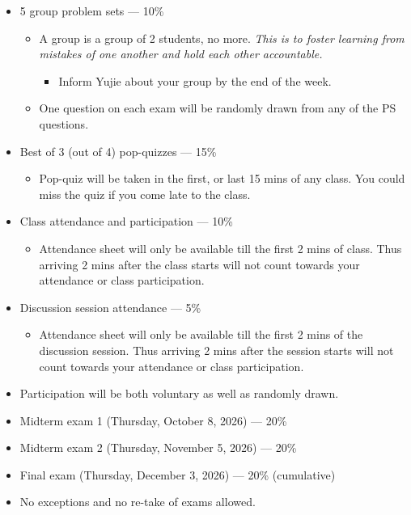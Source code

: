 \documentclass[11pt]{article}
\newcommand{\TAShort}{Yujie}
\newcommand{\MidtermOneDate}{Thursday, October 8, 2026}
\newcommand{\MidtermTwoDate}{Thursday, November 5, 2026}
\newcommand{\FinalDate}{Thursday, December 3, 2026}
\newcommand{\WtProblemSets}{10}
\newcommand{\WtQuizzes}{15}
\newcommand{\WtClassAtt}{10}
\newcommand{\WtDiscAtt}{5}
\newcommand{\WtMidtermOne}{20}
\newcommand{\WtMidtermTwo}{20}
\newcommand{\WtFinal}{20}
\newcommand{\NumProblemSets}{5}
\newcommand{\NumQuizzes}{4}
\newcommand{\NumQuizzesCounted}{3}
\begin{document}
\begin{itemize}
  \item \NumProblemSets{} group problem sets --- \WtProblemSets\%
        \begin{itemize}
          \item A group is a group of 2 students, no more. \emph{This is to
                foster learning from mistakes of one another and hold each other
                accountable.}
                \begin{itemize}
                  \item Inform \TAShort{} about your group by the end of the week.
                \end{itemize}
          \item One question on each exam will be randomly drawn from any of the
                PS questions.
        \end{itemize}
  \item Best of \NumQuizzesCounted{} (out of \NumQuizzes) pop-quizzes ---
        \WtQuizzes\%
        \begin{itemize}
          \item Pop-quiz will be taken in the first, or last 15 mins of any
                class. You could miss the quiz if you come late to the class.
        \end{itemize}
  \item Class attendance and participation --- \WtClassAtt\%
        \begin{itemize}
          \item Attendance sheet will only be available till the first 2 mins of
                class. Thus arriving 2 mins after the class starts will not count
                towards your attendance or class participation.
        \end{itemize}
  \item Discussion session attendance --- \WtDiscAtt\%
        \begin{itemize}
          \item Attendance sheet will only be available till the first 2 mins of
                the discussion session. Thus arriving 2 mins after the session
                starts will not count towards your attendance or class
                participation.
        \end{itemize}
  \item Participation will be both voluntary as well as randomly drawn.
  \item Midterm exam 1 (\MidtermOneDate) --- \WtMidtermOne\%
  \item Midterm exam 2 (\MidtermTwoDate) --- \WtMidtermTwo\%
  \item Final exam (\FinalDate) --- \WtFinal\% (cumulative)
  \item No exceptions and no re-take of exams allowed.
\end{itemize}
\end{document}
